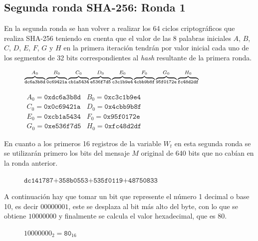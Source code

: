 \documentclass{article}
\begin{document}
    \subsection{Segunda ronda SHA-256: Ronda 1}
    En la segunda ronda se han volver a realizar los 64 ciclos criptográficos que realiza SHA-256 teniendo en cuenta que el valor de las 8 palabras iniciales $A$, $B$, $C$, $D$, $E$, $F$, $G$ y $H$ en la primera iteración tendrán por valor inicial cada uno de los segmentos de 32 bits correspondientes al \textit{hash} resultante de la primera ronda.
    
    \begin{figure}[H]
    \centering
        $\scriptsize{\overbrace{\texttt{dc6a3b8d}}^{A_{0}}\overbrace{\texttt{0c69421a}}^{B_{0}}\overbrace{\texttt{cb1a5434}}^{C_{0}}\overbrace{\texttt{e536f7d5}}^{D_{0}}\overbrace{\texttt{c3c1b9e4}}^{E_{0}}\overbrace{\texttt{4cbb9b8f}}^{F_{0}}\overbrace{\texttt{95f0172e}}^{G_{0}}\overbrace{\texttt{fc48d2df}}^{H_{0}}}$
    \end{figure}
    
    \begin{figure}[H]
    \centering
        $\begin{array}{rr}
            A_{0} = \texttt{0xdc6a3b8d} & B_{0} = \texttt{0xc3c1b9e4} \\
            C_{0} = \texttt{0x0c69421a} & D_{0} = \texttt{0x4cbb9b8f} \\
            E_{0} = \texttt{0xcb1a5434} & F_{0} = \texttt{0x95f0172e} \\
            G_{0} = \texttt{0xe536f7d5} & H_{0} = \texttt{0xfc48d2df}
        \end{array}$
    \end{figure}
    
    En cuanto a los primeros 16 registros de la variable $W_t$ en esta segunda ronda se se utilizarán primero los bits del mensaje $M$ original de 640 bits que no cabían en la ronda anterior.
    \begin{figure}[H]
    \centering
        $\texttt{dc141787+358b0553+535f0119+48750833}$
    \end{figure}
        
    A continuación hay que tomar un bit que represente el número 1 decimal o base 10, es decir $00000001$, este se desplaza al bit más alto del byte, con lo que se obtiene $10000000$ y finalmente se calcula el valor hexadecimal, que es $80$.
        \begin{figure}[H]
        \centering
            $10000000_{2} = \texttt{80}_{16}$
        \end{figure}
    
\end{document}
